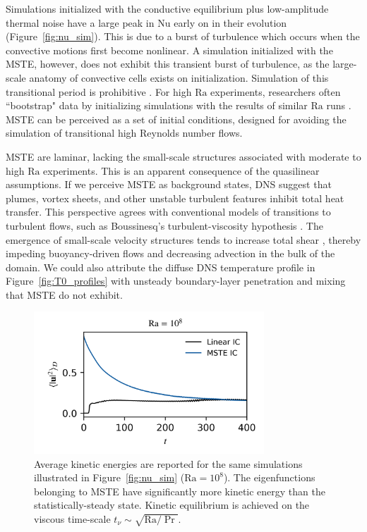 \documentclass[reprint,amsmath,amssymb,aps]{revtex4-1}
\newcommand\Ra{\mathrm{Ra}}
\newcommand\Nu{\mathrm{Nu}}
\begin{document}
Simulations initialized with the conductive equilibrium plus low-amplitude thermal noise have a large peak in $\Nu$ early on in their evolution (Figure~\ref{fig:nu_sim}).
This is due to a burst of turbulence which occurs when the convective motions first become nonlinear.
A simulation initialized with the MSTE, however, does not exhibit this transient burst of turbulence, as the large-scale anatomy of convective cells exists on initialization. 
Simulation of this transitional period is prohibitive \cite{Anders_AE}. 
For high $\Ra$ experiments, researchers often ``bootstrap" data by initializing simulations with the results of similar $\Ra$ runs \cite{Verzicco, Johnston}. 
MSTE can be perceived as a set of initial conditions, designed for avoiding the simulation of transitional high Reynolds number flows.

MSTE are laminar, lacking the small-scale structures associated with moderate to high $\Ra$ experiments. 
This is an apparent consequence of the quasilinear assumptions. 
If we perceive MSTE as background states, DNS suggest that plumes, vortex sheets, and other unstable turbulent features inhibit total heat transfer. 
This perspective agrees with conventional models of transitions to turbulent flows, such as Boussinesq's turbulent-viscosity hypothesis \cite{boussinesq_1877}. The emergence of small-scale velocity structures tends to increase total shear \cite{Lecoanet_KH, drazin_reid_2004, pope_2000}, thereby impeding buoyancy-driven flows and decreasing advection in the bulk of the domain. 
We could also attribute the diffuse DNS temperature profile in Figure~\ref{fig:T0_profiles} with unsteady boundary-layer penetration and mixing that MSTE do not exhibit.

\begin{figure}
    \begin{minipage}{3.4in}
        \centering
        \includegraphics[width=3.4in]{sim_eq_ke.png}
        \caption{Average kinetic energies are reported for the same simulations illustrated in Figure~\ref{fig:nu_sim} ($\Ra = 10^8$). 
        The eigenfunctions belonging to MSTE have significantly more kinetic energy than the statistically-steady state. 
        Kinetic equilibrium is achieved on the viscous time-scale $t_{\nu} \sim \sqrt{\Ra / \Pr}$.}
        \label{fig:ke_sim}
    \end{minipage}
\end{figure}
\end{document}
